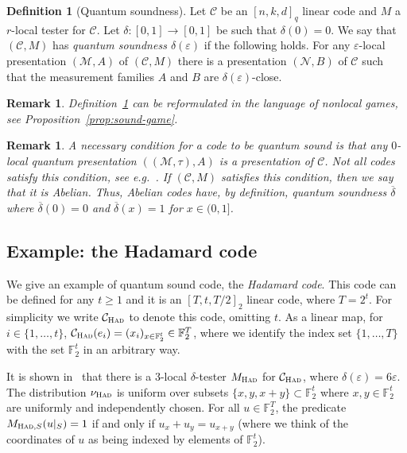 \documentclass[11pt]{article}
\newtheorem{remark}[theorem]{Remark}
\theoremstyle{definition}
\newtheorem{definition}[theorem]{Definition}
\newcommand{\code}{\mathcal{C}}
\DeclareMathOperator*{\Expectation}{\mathbb{E}}
\newcommand{\Es}[1]{\Expectation_{#1}}
\newcommand{\field}{\mathbb{F}_2}
\newcommand{\mC}{\ensuremath{\mathcal{C}}}
\newcommand{\mM}{\ensuremath{\mathcal{M}}}
\newcommand{\had}{\textsc{Had}}
\newcommand{\eps}{\varepsilon}
\newcommand{\mN}{\mathcal{N}}
\begin{document}
\begin{definition}[Quantum soundness]\label{def:q-sound}
Let $\code$ be an $[n,k,d]_q$ linear code and $M$ a $r$-local tester for $\code$. Let $\delta:[0,1]\to[0,1]$ be such that $\delta(0)=0$. We say that $(\code,M)$ has \emph{quantum soundness $\delta(\eps)$} if the following holds. For any $\eps$-local presentation $(\mM,A)$ of $(\code,M)$
there is a presentation $(\mN,B)$ of $\code$ such that the measurement families $A$ and $B$ are $\delta(\eps)$-close. 
\end{definition}

\begin{remark}
Definition~\ref{def:q-sound} can be reformulated in the language of nonlocal games, see Proposition~\ref{prop:sound-game}. 
\end{remark}

\begin{remark}
A necessary condition for a code to be quantum sound is that any $0$-local quantum presentation $((\mM,\tau),A)$ is  a presentation of $\mC$. Not all codes satisfy this condition, see e.g.~\cite[Example 2.16]{paddock2022arkhipov}. If $(\mC,M)$ satisfies this condition, then we say that it is \emph{Abelian}. Thus, Abelian codes have, by definition, quantum soundness $\overline{\delta}$ where $\overline{\delta}(0)=0$ and $\overline{\delta}(x)=1$ for $x\in(0,1]$. 
\end{remark}


		
		
\subsection{Example: the Hadamard code}
\label{sec:had}

We give an example of quantum sound code, the \emph{Hadamard code}. This code can be defined for any  $t\geq 1$ and it is an $[T,t,T/2]_2$ linear code, where $T=2^t$. For simplicity we write  $\code_\had$ to denote this code, omitting $t$. As a linear map, for $i\in\{1,\ldots,t\}$, $\code_\had(e_i) = (x_i)_{x\in \field^t} \in \field^T$, where we identify the index set $\{1,\ldots,T\}$ with the set $\field^t$ in an arbitrary way.  

It is shown in~\cite{blum1990self} that there is a $3$-local $\delta$-tester $M_\had$ for $\code_\had$, where $\delta(\eps)=6\eps$. The distribution $\nu_\had$ is uniform over subsets $\{ x, y, x+y \} \subset \field^t$ where $x,y\in \field^t$ are uniformly and independently chosen. For all $u \in \field^T$, the predicate $M_{\had,S}(u|_S) = 1$ if and only if $u_x + u_y = u_{x+y}$ (where we think of the coordinates of $u$ as being indexed by elements of $\field^t$). 
\end{document}
